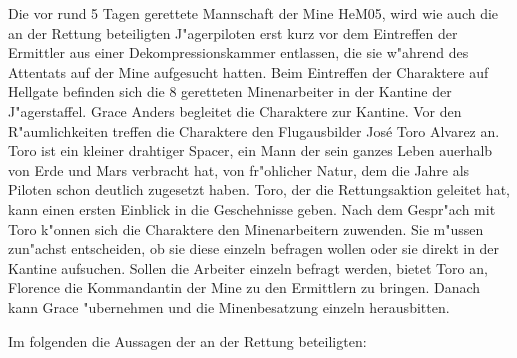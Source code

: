 
Die vor rund 5 Tagen gerettete Mannschaft der Mine HeM05, wird wie auch die an der Rettung beteiligten J"agerpiloten erst kurz vor dem Eintreffen der Ermittler aus einer Dekompressionskammer entlassen, die sie w"ahrend des Attentats auf der Mine aufgesucht hatten. Beim Eintreffen der Charaktere auf Hellgate befinden sich die 8 geretteten Minenarbeiter in der Kantine der J"agerstaffel. Grace Anders begleitet die Charaktere zur Kantine. Vor den R"aumlichkeiten treffen die Charaktere den Flugausbilder Jos\'{e} \frqq{}Toro\flqq{} Alvarez an. Toro ist ein kleiner drahtiger Spacer, ein Mann der sein ganzes Leben au\3erhalb von Erde und Mars verbracht hat, von fr"ohlicher Natur, dem die Jahre als Piloten schon deutlich zugesetzt haben. Toro, der die Rettungsaktion geleitet hat, kann einen ersten Einblick in die Geschehnisse geben. Nach dem Gespr"ach mit Toro k"onnen sich die Charaktere den Minenarbeitern zuwenden. Sie m"ussen zun"achst entscheiden, ob sie diese einzeln befragen wollen oder sie direkt in der Kantine aufsuchen. Sollen die Arbeiter einzeln befragt werden, bietet Toro an, Florence die Kommandantin der Mine zu den Ermittlern zu bringen. Danach kann Grace "ubernehmen und die Minenbesatzung einzeln herausbitten.

Im folgenden die Aussagen der an der Rettung beteiligten:

